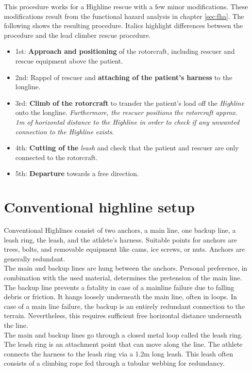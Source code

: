 \documentclass[a4paper,10pt]{scrartcl}
\begin{document}
This procedure works for a Highline rescue with a few minor modifications. These modifications result from the functional hazard analysis in chapter \ref{sec:fha}. The following shows the resulting procedure. Italics highlight differences between the procedure and the lead climber rescue procedure. 

\begin{itemize}
\item  1st: \textbf{Approach and positioning} of the rotorcraft, including rescuer and rescue equipment above the patient.
\item  2nd: Rappel of rescuer and \textbf{attaching of the patient's harness} to the longline.
\item 3rd: \textbf{Climb of the rotorcraft} to transfer the patient's load off the \textit{Highline} onto the longline. \textit{Furthermore, the rescuer positions the rotorcraft approx. 1m of horizontal distance to the Highline in order to check if any unwanted connection to the Highline exists}.
\item 4th: \textbf{Cutting of the} \textit{leash} and check that the patient and rescuer are only connected to the rotorcraft.
\item 5th: \textbf{Departure} towards a free direction.
\end{itemize}

\section{Conventional highline setup}
\label{sec:conventional}

Conventional Highlines consist of two anchors, a main line, one backup line, a leash ring, the leash, and the athlete's harness. Suitable points for anchors are trees, bolts, and removable equipment like cams, ice screws, or nuts. Anchors are generally redundant. \\
The main and backup lines are hung between the anchors. Personal preference, in combination with the used material, determines the pretension of the main line. The backup line prevents a fatality in case of a mainline failure due to falling debris or friction. It hangs loosely underneath the main line, often in loops. In case of a main line failure, the backup is an entirely redundant connection to the terrain. Nevertheless, this requires sufficient free horizontal distance underneath the line. \\
The main and backup lines go through a closed metal loop called the leash ring. The leash ring is an attachment point that can move along the line. The athlete connects the harness to the leash ring via a 1.2m long leash. This leash often consists of a climbing rope fed through a tubular webbing for redundancy.
\end{document}
